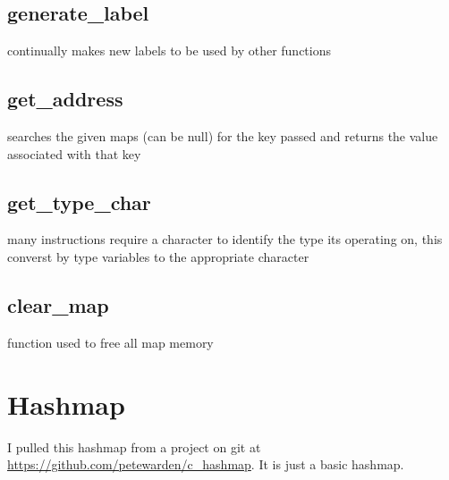 \documentclass[11pt]{article}
\begin{document}
        \subsection{generate\_label}
            continually makes new labels to be used by other functions

        \subsection{get\_address}
            searches the given maps (can be null) for the key passed
            and returns the value associated with that key

        \subsection{get\_type\_char}
            many instructions require a character to identify the type
            its operating on, this converst by type variables to the 
            appropriate character

        \subsection{clear\_map}
            function used to free all map memory

    \section{Hashmap}
        I pulled this hashmap from a project on git at \url{https://github.com/petewarden/c\_hashmap}.
        It is just a basic hashmap.
\end{document}
